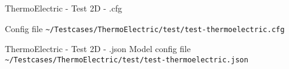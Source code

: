 \begin{frame}{ThermoElectric - Test 2D - .cfg}

Config file \lstinline{~/Testcases/ThermoElectric/test/test-thermoelectric.cfg}

\vspace{5mm}


\end{frame}


\begin{frame}{ThermoElectric - Test 2D - .json}
Model config file \lstinline{~/Testcases/ThermoElectric/test/test-thermoelectric.json}
\vspace{5mm}

\end{frame}


